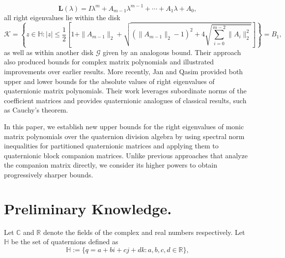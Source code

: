 \documentclass [12pt]{article}
\begin{document}
\[
\mathbf{L}(\lambda) = I\lambda^m + A_{m-1}\lambda^{m-1} + \cdots + A_1\lambda + A_0,
\]
all right eigenvalues lie within the disk
\[
\mathcal{K} = \left\{ z \in \mathbb{H} : |z| \leq \frac{1}{2}\left[1 + \|A_{m-1}\|_2 + \sqrt{\left(\|A_{m-1}\|_2 - 1\right)^2 + 4\sqrt{\sum_{i=0}^{m-2}\|A_i\|_2^2}} \right] \right\}=B_{1},
\]
as well as within another disk \(\mathcal{G}\) given by an analogous bound. Their approach also produced bounds for complex matrix polynomials and illustrated improvements over earlier results. More recently,  Jan and Qasim \cite{QJ} provided both upper and lower bounds for the absolute values of right eigenvalues of quaternionic matrix polynomials. Their work leverages subordinate norms of the coefficient matrices and provides quaternionic analogues of classical results, such as Cauchy's theorem.

In this paper, we establish new upper bounds for the right eigenvalues of monic matrix polynomials over the quaternion division algebra by using spectral norm inequalities for partitioned quaternionic matrices and applying them to quaternionic block companion matrices. Unlike previous approaches that analyze the companion matrix directly, we consider its higher powers to obtain progressively sharper bounds.

\section{Preliminary Knowledge.} Let $\mathbb{C}$ and $\mathbb{R}$ denote the fields of the complex and real numbers respectively. Let $\mathbb{H}$ be the set of quaternions defined as $$\mathbb{H}:=\{q=a+bi+cj+dk:a, b, c, d \in\mathbb{R} \},$$  
	 
\end{document}
